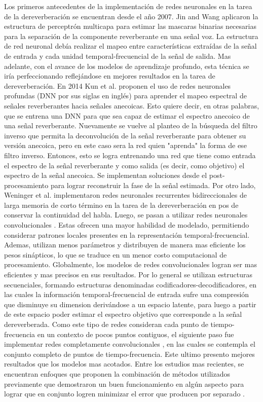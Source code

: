 Los primeros antecedentes de la implementación de redes neuronales en la tarea de la dereverberación se encuentran desde el año 2007. Jin and Wang \cite{MLP} aplicaron la estructura de perceptrón multicapa para estimar las mascaras binarias necesarias para la separación de la componente reverberante en una señal voz. La estructura de red neuronal debía realizar el mapeo entre características extraídas de la señal de entrada y cada unidad temporal-frecuencial de la señal de salida. Mas adelante, con el avance de los modelos de aprendizaje profundo, esta técnica se iría perfeccionando reflejándose en mejores resultados en la tarea de dereverberación. En 2014 Kun et al.\cite{ezeKun} proponen el uso de redes neuronales profundas (DNN por sus siglas en inglés) para aprender el mapeo espectral de señales reverberantes hacia señales anecoicas. Esto quiere decir, en otras palabras, que se entrena una DNN para que sea capaz de estimar el espectro anecoico de una señal reverberante. Nuevamente se vuelve al planteo de la búsqueda del filtro inverso que permita la deconvolución de la señal reverberante para obtener su versión anecoica, pero en este caso sera la red quien "aprenda" la forma de ese filtro inverso. Entonces, esto se logra entrenando una red que tiene como entrada el espectro de la señal reverberante y como salida (es decir, como objetivo) el espectro de la señal anecoica. Se implementan soluciones desde el post-procesamiento para lograr reconstruir la fase de la señal estimada.
Por otro lado, Weninger et al. \cite{RNN} implementaron redes neuronales recurrentes bidireccionales de larga memoria de corto término en la tarea de la dereverberación en pos de conservar la continuidad del habla. 
Luego, se pasan a utilizar redes neuronales convolucionales \cite{CNN}. Estas ofrecen una mayor habilidad de modelado, permitiendo considerar patrones locales presentes en la representación temporal-frecuencial. Ademas, utilizan menos parámetros y distribuyen de manera mas eficiente los pesos sinápticos, lo que se traduce en un menor costo computacional de procesamiento. Globalmente, los modelos de redes convolucionales logran ser mas eficientes y mas precisos en sus resultados. Por lo general se utilizan estructuras secuenciales, formando estructuras denominadas codificadores-decodificadores, en las cuales la información temporal-frecuencial de entrada sufre una compresión que disminuye su dimension derivándose a un espacio latente, para luego a partir de este espacio poder estimar el espectro objetivo que corresponde a la señal dereverberada. Como este tipo de redes consideran cada punto de tiempo-frecuencia en un contexto de pocos puntos contiguos, el siguiente paso fue implementar redes completamente convolucionales \cite{FCN}, en las cuales se contempla el conjunto completo de puntos de tiempo-frecuencia. Este ultimo presento mejores resultados que los modelos mas acotados. 
Entre los estudios mas recientes, se encuentran enfoques que proponen la combinación de métodos utilizados previamente que demostraron un buen funcionamiento en algún aspecto para lograr que en conjunto logren minimizar el error que producen por separado \cite{fusion}.  